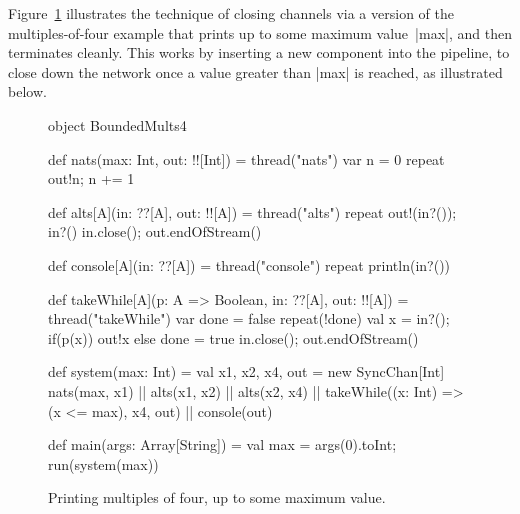 Figure~\ref{fig:BoundedMults4} illustrates the technique of closing channels
via a version of the multiples-of-four example that prints up to some maximum
value~|max|, and then terminates cleanly.  This works by inserting a new
component into the pipeline, to close down the network once a value greater
than |max| is reached, as illustrated below.
%
\begin{center}
\end{center}


\begin{figure}
\begin{scala}
object BoundedMults4{
  def nats(max: Int, out: !![Int]) = thread("nats"){ 
    var n = 0
    repeat{ out!n; n += 1 }
  }

  def alts[A](in: ??[A], out: !![A]) = thread("alts"){ 
    repeat{ out!(in?()); in?() }
    in.close(); out.endOfStream()
  }

  def console[A](in: ??[A]) = thread("console"){ repeat{ println(in?()) } }

  def takeWhile[A](p: A => Boolean, in: ??[A], out: !![A]) = thread("takeWhile"){
    var done = false
    repeat(!done){ val x = in?(); if(p(x)) out!x else done = true }
    in.close(); out.endOfStream()
  }

  def system(max: Int) = {
    val x1, x2, x4, out = new SyncChan[Int]
    nats(max, x1) || alts(x1, x2) || alts(x2, x4) || 
      takeWhile((x: Int) => (x <= max), x4, out) || console(out)
  }

  def main(args: Array[String]) = {
    val max = args(0).toInt; run(system(max))
  }
}
\end{scala}
\caption{Printing multiples of four, up to some maximum value.}
\label{fig:BoundedMults4}
\end{figure}

